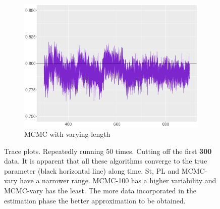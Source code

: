 \begin{figure}[h]
\begin{subfigure}[t]{0.46\textwidth}
\includegraphics[width=\textwidth]{Chapters/04Filtering/plot/MCMCchainVary.pdf}
 \caption{MCMC with varying-length}
   \end{subfigure}
\caption{Trace plots. Repeatedly running 50 times. Cutting off the first \textbf{300} data. It is apparent that all these algorithms converge to the true parameter (black horizontal line) along time. St, PL and MCMC-vary have a narrower range. MCMC-100 has a higher variability and MCMC-vary has the least. The more data incorporated in the estimation phase the better approximation to be obtained. }\label{FilterRiewComparesion01}
\end{figure}

